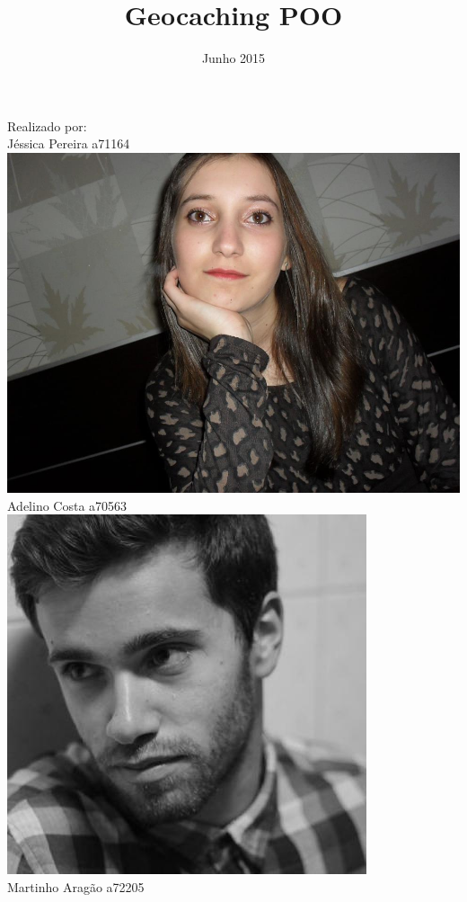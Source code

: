 \documentclass[a4paper,12pt]{article}
\title{Geocaching POO}
\date{Junho 2015}
\begin{document}
\maketitle
\begin{center}
Realizado por: \\
Jéssica Pereira a71164	\\
\includegraphics[height=3\baselineskip,natwidth=369,natheight=430]{jessica0.jpg}\\
Adelino Costa a70563\\
\includegraphics[height=3\baselineskip,natwidth=369,natheight=430]{adelino.jpg}\\
Martinho Aragão a72205 \\

\end{center}
\end{document}
